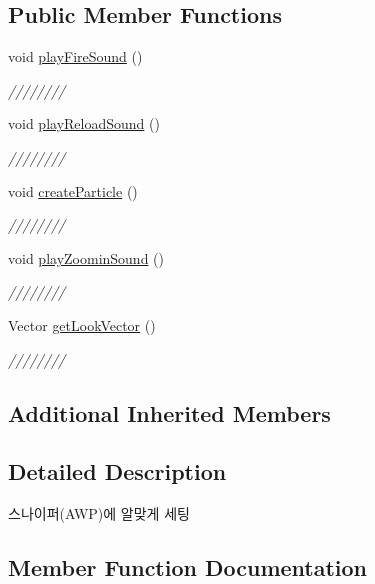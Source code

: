 \subsection*{Public Member Functions}
\begin{DoxyCompactItemize}
\item 
void \hyperlink{class_a_w_p___weapons_a6e9230f149030756f9dd3163efa3ea0b}{play\+Fire\+Sound} ()
\begin{DoxyCompactList}\small\item\em //////// \end{DoxyCompactList}\item 
void \hyperlink{class_a_w_p___weapons_a6055556a3c59ba72f117dd554f9058c3}{play\+Reload\+Sound} ()
\begin{DoxyCompactList}\small\item\em //////// \end{DoxyCompactList}\item 
void \hyperlink{class_a_w_p___weapons_a2af8bc2f2c8594ceafd947c8e689191b}{create\+Particle} ()
\begin{DoxyCompactList}\small\item\em //////// \end{DoxyCompactList}\item 
void \hyperlink{class_a_w_p___weapons_a89875d9d9f47f1156cf559fe0f7d9224}{play\+Zoomin\+Sound} ()
\begin{DoxyCompactList}\small\item\em //////// \end{DoxyCompactList}\item 
Vector \hyperlink{class_a_w_p___weapons_a878a7cceb3c17fdd1b3f64f84191e395}{get\+Look\+Vector} ()
\begin{DoxyCompactList}\small\item\em //////// \end{DoxyCompactList}\end{DoxyCompactItemize}
\subsection*{Additional Inherited Members}


\subsection{Detailed Description}
스나이퍼(\+A\+W\+P)에 알맞게 세팅 

\subsection{Member Function Documentation}
